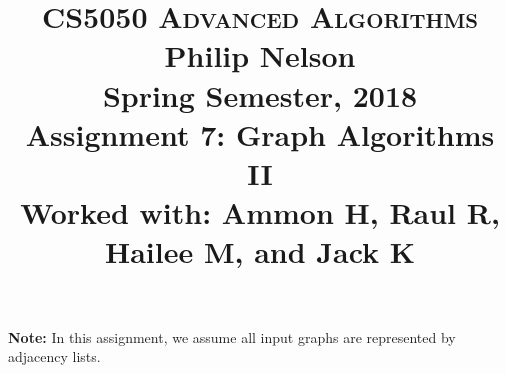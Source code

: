 \documentclass[11pt]{article}
\begin{document}
\baselineskip=14.0pt

\title{CS5050 \textsc{Advanced Algorithms}
\\ {\bf Philip Nelson}
\\{\Large Spring Semester, 2018}
\\ Assignment 7: Graph Algorithms II
\\ {\large Worked with: Ammon H, Raul R, Hailee M, and Jack K}}
\date{}

\maketitle

\vspace{-0.6in}

{\bf Note:} In this assignment, we assume all input graphs are represented by adjacency lists.
\end{document}
